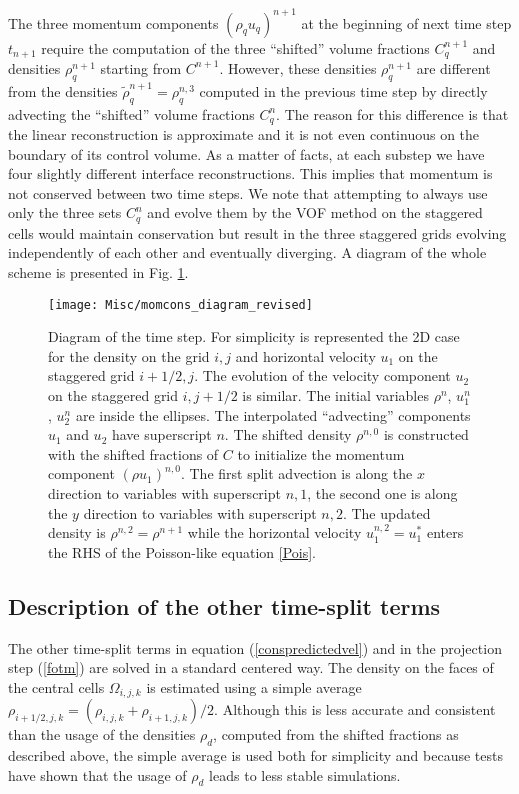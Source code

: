 The three momentum components $(\rho_q u_q)^{n+1}$ at the beginning of next time step
$t_{n+1}$ require the computation of the three ``shifted''  volume fractions $C^{n+1}_q$
and densities $\rho^{n+1}_q$ starting from $C^{n+1}$. However, these densities
$\rho^{n+1}_q$ are different from the densities $\tilde \rho_q^{n+1} = \rho_q^{n,3}$
computed in the previous  time step by directly advecting the 
``shifted'' volume fractions $C^{n}_q$. The reason for this difference is that the
linear reconstruction is approximate and it is not even continuous on the 
boundary of its control volume. As a matter of facts, at each substep we have
four slightly different interface reconstructions. This implies that momentum is
not conserved between two time steps. We note that  attempting to always use only the three 
sets $C^{n}_{q}$  and evolve them by the VOF method on the staggered cells 
would maintain conservation but result in the three staggered grids evolving independently 
of each other and eventually diverging.
A diagram of the whole scheme is presented in Fig. \ref{figscheme}.
\begin{figure}
\begin{center}
    \texttt{[image: Misc/momcons\_diagram\_revised]}
\end{center}
\caption{Diagram of the time step. For simplicity is represented the 2D case for the
density on the grid $i,j$ and horizontal velocity $u_1$ on the staggered grid $i+1/2,j$.
The evolution of the velocity component $u_2$ on the staggered grid $i,j+1/2$ is similar.
The initial variables $\rho^n$, $u_1^n$, $u_2^n$ are inside the ellipses. The interpolated
``advecting'' components $u_1$ and $u_2$ have superscript $n$. The shifted density $\rho^{n,0}$
is constructed with the shifted fractions of $C$ to initialize the momentum component
$(\rho u_1)^{n,0}$. The first split advection is along the $x$ direction  to 
variables with superscript $n,1$, the second one is along the $y$ direction to
variables with superscript $n,2$. The updated density is $\rho^{n,2}=\rho^{n+1}$
while the horizontal velocity $u_1^{n,2}=u_1^{*}$ enters the RHS of the Poisson-like
equation \eqref{Pois}.}
\label{figscheme}
\end{figure}

\subsection{Description of the other time-split terms}

The other time-split terms in equation (\ref{conspredictedvel}) and in the projection
step (\ref{fotm}) are solved in a standard centered way. The density on the faces
of the central cells $\Omega_{i,j,k}$ is estimated using a simple average
$\rho_{i+1/2,j,k} = (\rho_{i,j,k} + \rho_{i+1,j,k})/2$. Although this is less accurate and 
consistent than the usage of the densities $\rho_d$, computed from
the shifted fractions as described above, the simple average 
is used both for simplicity and because tests have shown that the usage
of $\rho_d$ leads to less stable simulations. 

